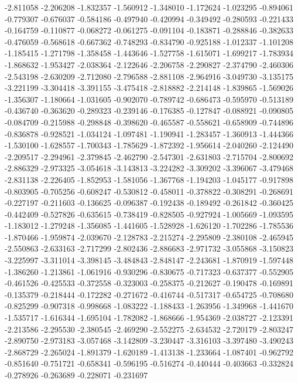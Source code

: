 -2.811058
-2.206208
-1.832357
-1.560912
-1.348010
-1.172624
-1.023295
-0.894061
-0.779307
-0.676037
-0.584186
-0.497940
-0.420994
-0.349492
-0.280593
-0.221433
-0.164759
-0.110877
-0.068272
-0.061275
-0.091104
-0.183871
-0.288846
-0.382633
-0.476059
-0.568618
-0.667362
-0.748293
-0.834790
-0.925188
-1.012337
-1.101208
-1.185415
-1.271798
-1.358458
-1.443646
-1.527758
-1.615071
-1.699217
-1.783934
-1.868632
-1.953427
-2.038364
-2.122646
-2.206758
-2.290827
-2.374790
-2.460306
-2.543198
-2.630209
-2.712080
-2.796588
-2.881108
-2.964916
-3.049730
-3.135175
-3.221199
-3.304418
-3.391155
-3.475418
-2.818882
-2.214148
-1.839865
-1.569026
-1.356307
-1.180664
-1.031605
-0.902070
-0.789742
-0.686473
-0.595970
-0.513189
-0.436740
-0.363620
-0.289323
-0.239146
-0.176385
-0.127847
-0.088921
-0.090805
-0.084709
-0.215988
-0.298848
-0.398620
-0.465587
-0.558621
-0.658909
-0.744896
-0.836878
-0.928521
-1.034124
-1.097481
-1.190941
-1.283457
-1.360913
-1.444366
-1.530100
-1.628557
-1.700343
-1.785629
-1.872392
-1.956614
-2.040260
-2.124490
-2.209517
-2.294961
-2.379845
-2.462790
-2.547301
-2.631803
-2.715704
-2.800692
-2.886329
-2.973325
-3.054618
-3.143813
-3.224282
-3.309202
-3.396067
-3.479468
-2.831138
-2.226405
-1.852953
-1.581056
-1.367768
-1.194203
-1.045177
-0.917898
-0.803905
-0.705256
-0.608247
-0.530812
-0.458011
-0.378822
-0.308291
-0.268691
-0.227197
-0.211603
-0.136625
-0.096387
-0.192438
-0.189492
-0.261842
-0.360425
-0.442409
-0.527826
-0.635615
-0.738419
-0.828505
-0.927924
-1.005669
-1.093595
-1.183012
-1.279248
-1.356085
-1.441605
-1.528928
-1.626120
-1.702286
-1.785536
-1.870466
-1.959874
-2.039670
-2.128783
-2.215274
-2.295809
-2.380108
-2.465945
-2.550863
-2.633163
-2.717299
-2.802436
-2.886683
-2.971732
-3.055868
-3.150823
-3.225997
-3.311014
-3.398145
-3.484843
-2.848147
-2.243681
-1.870919
-1.597448
-1.386260
-1.213861
-1.061916
-0.930296
-0.830675
-0.717323
-0.637377
-0.552905
-0.461526
-0.425533
-0.372558
-0.323003
-0.258375
-0.212627
-0.190478
-0.169891
-0.135379
-0.218444
-0.172282
-0.271672
-0.416744
-0.517317
-0.654725
-0.708680
-0.825299
-0.907318
-0.998668
-1.083222
-1.188433
-1.263956
-1.349968
-1.441670
-1.535717
-1.616344
-1.695104
-1.782082
-1.868666
-1.954369
-2.038727
-2.123391
-2.213586
-2.295530
-2.380545
-2.469290
-2.552275
-2.634532
-2.720179
-2.803247
-2.890750
-2.973183
-3.057468
-3.142809
-3.230447
-3.316103
-3.397480
-3.490243
-2.868729
-2.265024
-1.891379
-1.620189
-1.413138
-1.233664
-1.087401
-0.962792
-0.851640
-0.751721
-0.658341
-0.596195
-0.516274
-0.440444
-0.403663
-0.332824
-0.278926
-0.263689
-0.228071
-0.231697
